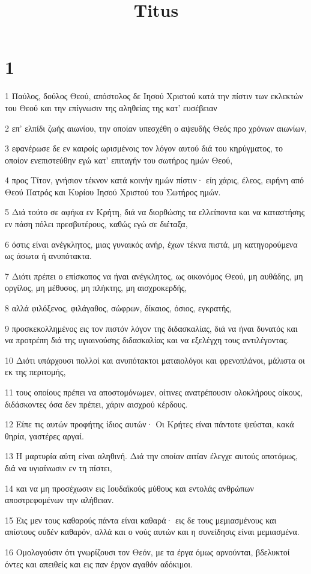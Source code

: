 

\title{Titus}


\chapter{1}

\par 1 Παύλος, δούλος Θεού, απόστολος δε Ιησού Χριστού κατά την πίστιν των εκλεκτών του Θεού και την επίγνωσιν της αληθείας της κατ' ευσέβειαν
\par 2 επ' ελπίδι ζωής αιωνίου, την οποίαν υπεσχέθη ο αψευδής Θεός προ χρόνων αιωνίων,
\par 3 εφανέρωσε δε εν καιροίς ωρισμένοις τον λόγον αυτού διά του κηρύγματος, το οποίον ενεπιστεύθην εγώ κατ' επιταγήν του σωτήρος ημών Θεού,
\par 4 προς Τίτον, γνήσιον τέκνον κατά κοινήν ημών πίστιν· είη χάρις, έλεος, ειρήνη από Θεού Πατρός και Κυρίου Ιησού Χριστού του Σωτήρος ημών.
\par 5 Διά τούτο σε αφήκα εν Κρήτη, διά να διορθώσης τα ελλείποντα και να καταστήσης εν πάση πόλει πρεσβυτέρους, καθώς εγώ σε διέταξα,
\par 6 όστις είναι ανέγκλητος, μιας γυναικός ανήρ, έχων τέκνα πιστά, μη κατηγορούμενα ως άσωτα ή ανυπότακτα.
\par 7 Διότι πρέπει ο επίσκοπος να ήναι ανέγκλητος, ως οικονόμος Θεού, μη αυθάδης, μη οργίλος, μη μέθυσος, μη πλήκτης, μη αισχροκερδής,
\par 8 αλλά φιλόξενος, φιλάγαθος, σώφρων, δίκαιος, όσιος, εγκρατής,
\par 9 προσκεκολλημένος εις τον πιστόν λόγον της διδασκαλίας, διά να ήναι δυνατός και να προτρέπη διά της υγιαινούσης διδασκαλίας και να εξελέγχη τους αντιλέγοντας.
\par 10 Διότι υπάρχουσι πολλοί και ανυπότακτοι ματαιολόγοι και φρενοπλάνοι, μάλιστα οι εκ της περιτομής,
\par 11 τους οποίους πρέπει να αποστομόνωμεν, οίτινες ανατρέπουσιν ολοκλήρους οίκους, διδάσκοντες όσα δεν πρέπει, χάριν αισχρού κέρδους.
\par 12 Είπε τις αυτών προφήτης ίδιος αυτών· Οι Κρήτες είναι πάντοτε ψεύσται, κακά θηρία, γαστέρες αργαί.
\par 13 Η μαρτυρία αύτη είναι αληθινή. Διά την οποίαν αιτίαν έλεγχε αυτούς αποτόμως, διά να υγιαίνωσιν εν τη πίστει,
\par 14 και να μη προσέχωσιν εις Ιουδαϊκούς μύθους και εντολάς ανθρώπων αποστρεφομένων την αλήθειαν.
\par 15 Εις μεν τους καθαρούς πάντα είναι καθαρά· εις δε τους μεμιασμένους και απίστους ουδέν καθαρόν, αλλά και ο νούς αυτών και η συνείδησις είναι μεμιασμένα.
\par 16 Ομολογούσιν ότι γνωρίζουσι τον Θεόν, με τα έργα όμως αρνούνται, βδελυκτοί όντες και απειθείς και εις παν έργον αγαθόν αδόκιμοι.

